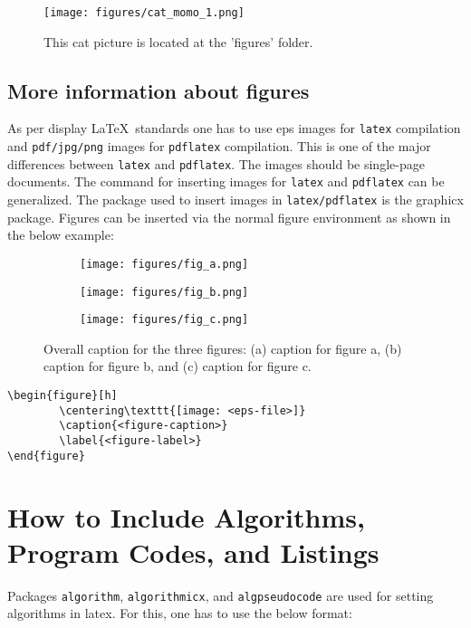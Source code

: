 \documentclass[12pt,a4paper]{article}
\begin{document}
\begin{figure}[!ht]
\centering
\texttt{[image: figures/cat\_momo\_1.png]}
\caption{\label{fig:cat1}This cat picture is located at the 'figures' folder.}
\end{figure}

\subsection{More information about figures}

As per display \LaTeX\ standards one has to use eps images for \verb+latex+ compilation and \verb+pdf/jpg/png+ images for
\verb+pdflatex+ compilation. This is one of the major differences between \verb+latex+
and \verb+pdflatex+. The images should be single-page documents. The command for inserting images
for \verb+latex+ and \verb+pdflatex+ can be generalized. The package used to insert images in \verb+latex/pdflatex+ is the
graphicx package. Figures can be inserted via the normal figure environment as shown in the below example:


\begin{figure}[!ht]
    \begin{subfigure}{0.3\textwidth}
        \texttt{[image: figures/fig\_a.png]}
        \caption{}
    \end{subfigure}
    \hfill
    \begin{subfigure}{0.3\textwidth}
        \texttt{[image: figures/fig\_b.png]}
        \caption{}
    \end{subfigure}
    \hfill
    \begin{subfigure}{0.3\textwidth}
        \texttt{[image: figures/fig\_c.png]}
        \caption{}
    \end{subfigure}
    \caption{Overall caption for the three figures: (a) caption for figure a, (b) caption for figure b, and (c) caption for figure c.}
    \label{fig:multi_figs}
\end{figure}


\begin{verbatim}
\begin{figure}[h]
        \centering\texttt{[image: <eps-file>]}
        \caption{<figure-caption>}
        \label{<figure-label>}
\end{figure}
\end{verbatim}


\section{How to Include Algorithms, Program Codes, and Listings}\label{sec8}
Packages \verb+algorithm+, \verb+algorithmicx+, and \verb+algpseudocode+ are used for setting algorithms in latex.
For this, one has to use the below format:
\end{document}
